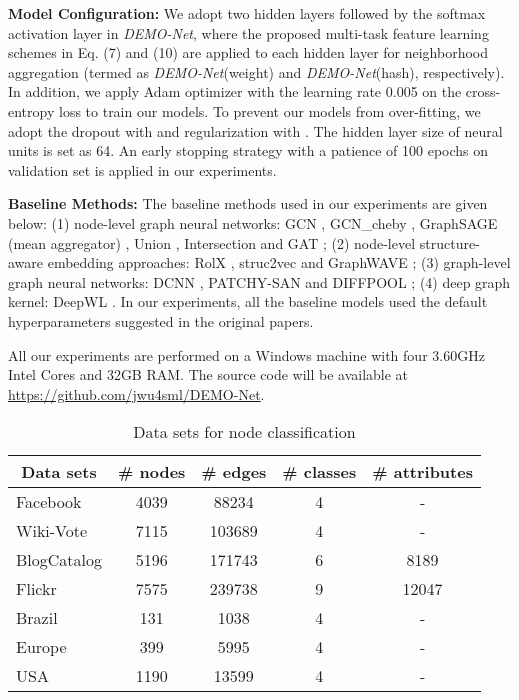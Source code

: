 \documentclass[sigconf]{acmart}
\newcommand{\demonet}{{\emph {DEMO-Net}}}
\begin{document}
\noindent\textbf{Model Configuration: } We adopt two hidden layers followed by the softmax activation layer in \demonet, where the proposed multi-task feature learning schemes in Eq. (7) and (10) are applied to each hidden layer for neighborhood aggregation (termed as {\demonet (weight)} and {\demonet (hash)}, respectively). In addition, we apply Adam optimizer \cite{kingma2014adam} with the learning rate 0.005 on the cross-entropy loss to train our models. To prevent our models from over-fitting, we adopt the dropout \cite{srivastava2014dropout} with  and  regularization with . The hidden layer size of neural units is set as 64. An early stopping strategy with a patience of 100 epochs on validation set is applied in our experiments.

\noindent\textbf{Baseline Methods: } The baseline methods used in our experiments are given below: (1) node-level graph neural networks: GCN \cite{kipf2016semi}, GCN\_cheby \cite{kipf2016semi}, GraphSAGE (mean aggregator) \cite{hamilton2017inductive}, Union \cite{li2018deeper}, Intersection \cite{li2018deeper} and GAT \cite{velickovic2017graph}; (2) node-level structure-aware embedding approaches: RolX \cite{henderson2012rolx}, struc2vec \cite{ribeiro2017struc2vec} and GraphWAVE \cite{donnat2018learning}; (3) graph-level graph neural networks: DCNN \cite{atwood2016diffusion}, PATCHY-SAN \cite{niepert2016learning} and DIFFPOOL \cite{ying2018hierarchical}; (4) deep graph kernel: DeepWL \cite{yanardag2015deep}. In our experiments, all the baseline models used the default hyperparameters suggested in the original papers.

All our experiments are performed on a Windows machine with four 3.60GHz Intel Cores and 32GB RAM. The source code will be available at \url{https://github.com/jwu4sml/DEMO-Net}.

\begin{table}
\caption{Data sets for node classification}
\label{node_datasets}
\small
\begin{tabular}{|l|c|c|c|c|}
\hline
\multicolumn{1}{|c|}{Data sets} & \# nodes & \# edges & \# classes & \# attributes \\\hline
Facebook & 4039 & 88234 & 4 & - \\ \hline
Wiki-Vote & 7115 & 103689 & 4 & - \\ \hline
BlogCatalog                   & 5196    & 171743  & 6         & 8189         \\\hline
Flickr                        & 7575    & 239738  & 9         & 12047        \\\hline
Brazil                        & 131     & 1038    & 4         & -            \\\hline
Europe                        & 399     & 5995   & 4         & -            \\\hline
USA                           & 1190    & 13599   & 4         & -           \\ \hline
\end{tabular}
\vspace{-3mm}
\end{table}
\end{document}
